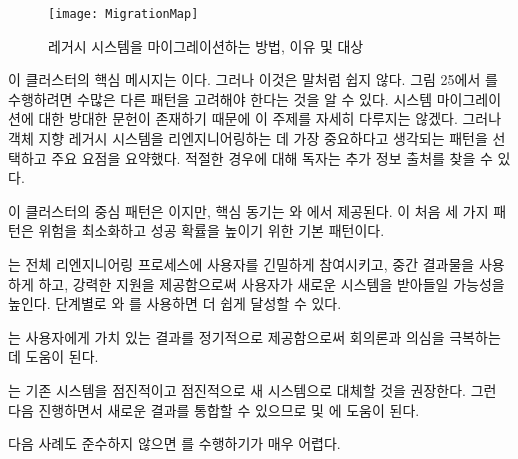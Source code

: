 \documentclass[a4paper,10pt,twoside]{book}
\begin{document}
\begin{figure}
\begin{center}
\texttt{[image: MigrationMap]}
\caption{레거시 시스템을 마이그레이션하는 방법, 이유 및 대상}
\end{center}
\end{figure}

이 클러스터의 핵심 메시지는 이다. 그러나 이것은 말처럼 쉽지 않다. 그림 25에서 를 수행하려면 수많은 다른 패턴을 고려해야 한다는 것을 알 수 있다. 시스템 마이그레이션에 대한 방대한 문헌이 존재하기 때문에 이 주제를 자세히 다루지는 않겠다. 그러나 객체 지향 레거시 시스템을 리엔지니어링하는 데 가장 중요하다고 생각되는 패턴을 선택하고 주요 요점을 요약했다. 적절한 경우에 대해 독자는 추가 정보 출처를 찾을 수 있다.

이 클러스터의 중심 패턴은 이지만, 핵심 동기는 와 에서 제공된다. 이 처음 세 가지 패턴은 위험을 최소화하고 성공 확률을 높이기 위한 기본 패턴이다.

\begin{bulletlist}
\item {}는 전체 리엔지니어링 프로세스에 사용자를 긴밀하게 참여시키고, 중간 결과물을 사용하게 하고, 강력한 지원을 제공함으로써 사용자가 새로운 시스템을 받아들일 가능성을 높인다. 단계별로 와 를 사용하면 더 쉽게 달성할 수 있다.

\item {}는 사용자에게 가치 있는 결과를 정기적으로 제공함으로써 회의론과 의심을 극복하는 데 도움이 된다. 

\item {}는 기존 시스템을 점진적이고 점진적으로 새 시스템으로 대체할 것을 권장한다. 그런 다음 진행하면서 새로운 결과를 통합할 수 있으므로  및 에 도움이 된다.
\end{bulletlist}

다음 사례도 준수하지 않으면 를 수행하기가 매우 어렵다.
\end{document}
